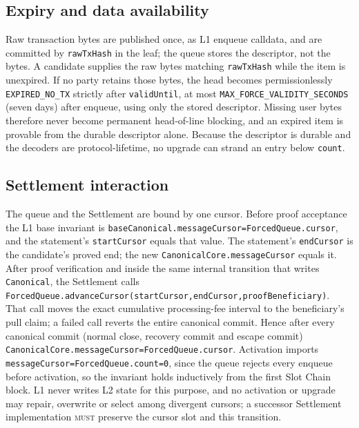 \documentclass[a4paper,11pt]{article}
\newcommand{\code}[1]{\nolinkurl{#1}}
\newcommand{\must}{\textsc{must}}
\begin{document}
\subsection{Expiry and data availability}\label{sec:forced-availability}

Raw transaction bytes are published once, as L1 enqueue calldata, and are
committed by \code{rawTxHash} in the leaf; the queue stores the descriptor,
not the bytes.  A candidate supplies the raw bytes matching \code{rawTxHash}
while the item is unexpired.  If no party retains those bytes, the head
becomes permissionlessly \code{EXPIRED_NO_TX} strictly after
\code{validUntil}, at most \code{MAX_FORCE_VALIDITY_SECONDS} (seven days)
after enqueue, using only the stored descriptor.  Missing user bytes
therefore never become permanent head-of-line blocking, and an expired item
is provable from the durable descriptor alone.  Because the descriptor is
durable and the decoders are protocol-lifetime, no upgrade can strand an
entry below \code{count}.

\subsection{Settlement interaction}\label{sec:forced-settlement}

The queue and the Settlement are bound by one cursor.  Before proof
acceptance the L1 base invariant is
\code{baseCanonical.messageCursor=ForcedQueue.cursor}, and the statement's
\code{startCursor} equals that value.  The statement's \code{endCursor} is
the candidate's proved end; the new \code{CanonicalCore.messageCursor}
equals it.  After proof verification and inside the same internal transition
that writes \code{Canonical}, the Settlement calls
\code{ForcedQueue.advanceCursor(startCursor,endCursor,proofBeneficiary)}.
That call moves the exact cumulative processing-fee interval to the
beneficiary's pull claim; a failed call reverts the entire canonical commit.
Hence after every canonical commit (normal close, recovery commit and escape
commit) \code{CanonicalCore.messageCursor=ForcedQueue.cursor}.  Activation
imports \code{messageCursor=ForcedQueue.count=0}, since the queue rejects
every enqueue before activation, so the invariant holds inductively from the
first Slot Chain block.  L1 never writes L2 state for this purpose, and no
activation or upgrade may repair, overwrite or select among divergent
cursors; a successor Settlement implementation \must{} preserve the cursor
slot and this transition.
\end{document}
